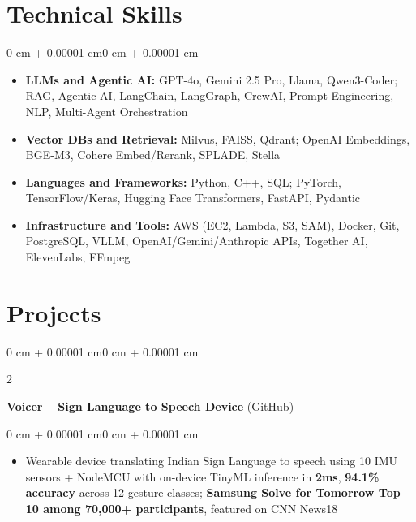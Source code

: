 \documentclass[10pt, letterpaper]{article}
\newenvironment{highlights}{
    \begin{itemize}[
        topsep=0.01 cm,
        parsep=0.01 cm,
        partopsep=0pt,
        itemsep=0pt,
        leftmargin=0 cm + 10pt
    ]
}{
    \end{itemize}
}
\newenvironment{highlightsforbulletentries}{
    \begin{itemize}[
        topsep=0.01 cm,
        parsep=0.01 cm,
        partopsep=0pt,
        itemsep=0pt,
        leftmargin=10pt
    ]
}{
    \end{itemize}
}
\newenvironment{onecolentry}{
    \begin{adjustwidth}{0 cm + 0.00001 cm}{0 cm + 0.00001 cm}
}{
    \end{adjustwidth}
}
\newenvironment{twocolentry}[2][]{
    \onecolentry
    \def\secondColumn{#2}
    \setcolumnwidth{\fill, 5.5 cm}
    \begin{paracol}{2}
}{
    \switchcolumn \raggedleft \secondColumn
    \end{paracol}
    \endonecolentry
}
\let\hrefWithoutArrow\href
\begin{document}
    \section{Technical Skills}

    \begin{onecolentry}
        \begin{highlightsforbulletentries}
            \item \textbf{LLMs and Agentic AI:} GPT-4o, Gemini 2.5 Pro, Llama, Qwen3-Coder; RAG, Agentic AI, LangChain, LangGraph, CrewAI, Prompt Engineering, NLP, Multi-Agent Orchestration
            \item \textbf{Vector DBs and Retrieval:} Milvus, FAISS, Qdrant; OpenAI Embeddings, BGE-M3, Cohere Embed/Rerank, SPLADE, Stella
            \item \textbf{Languages and Frameworks:} Python, C++, SQL; PyTorch, TensorFlow/Keras, Hugging Face Transformers, FastAPI, Pydantic
            \item \textbf{Infrastructure and Tools:} AWS (EC2, Lambda, S3, SAM), Docker, Git, PostgreSQL, VLLM, OpenAI/Gemini/Anthropic APIs, Together AI, ElevenLabs, FFmpeg
        \end{highlightsforbulletentries}
    \end{onecolentry}

    \section{Projects}

        \begin{twocolentry}{
            2023
        }
            \textbf{Voicer -- Sign Language to Speech Device} (\hrefWithoutArrow{https://github.com/amit-gohel/voicer}{GitHub})
        \end{twocolentry}

        \vspace{0.02 cm}
        \begin{onecolentry}
            \begin{highlights}
                \item Wearable device translating Indian Sign Language to speech using 10 IMU sensors + NodeMCU with on-device TinyML inference in \textbf{2ms}, \textbf{94.1\% accuracy} across 12 gesture classes; \textbf{Samsung Solve for Tomorrow Top 10 among 70,000+ participants}, featured on CNN News18
            \end{highlights}
        \end{onecolentry}
\end{document}
